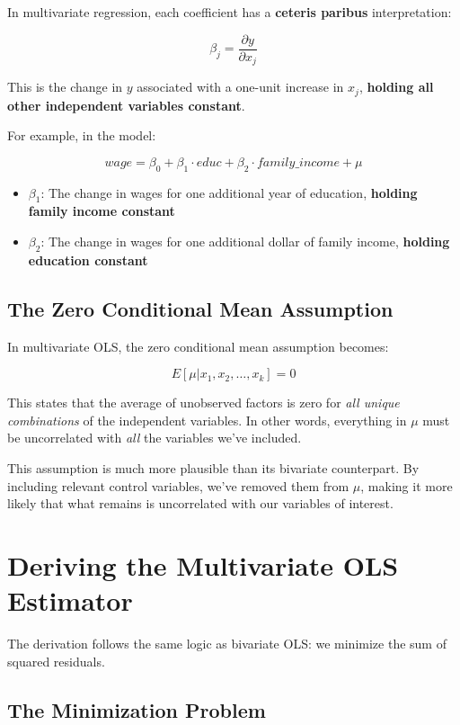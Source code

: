 \documentclass[
  letterpaper,
  DIV=11,
  numbers=noendperiod]{scrreprt}
\providecommand{\tightlist}{%
  \setlength{\itemsep}{0pt}\setlength{\parskip}{0pt}}
\begin{document}
In multivariate regression, each coefficient has a \textbf{ceteris
paribus} interpretation:

\[
\beta_j = \frac{\partial y}{\partial x_j}
\]

This is the change in \(y\) associated with a one-unit increase in
\(x_j\), \textbf{holding all other independent variables constant}.

For example, in the model:

\[
wage = \beta_0 + \beta_1 \cdot educ + \beta_2 \cdot family\_income + \mu
\]

\begin{itemize}
\tightlist
\item
  \(\beta_1\): The change in wages for one additional year of education,
  \textbf{holding family income constant}
\item
  \(\beta_2\): The change in wages for one additional dollar of family
  income, \textbf{holding education constant}
\end{itemize}

\subsection{The Zero Conditional Mean
Assumption}\label{the-zero-conditional-mean-assumption}

In multivariate OLS, the zero conditional mean assumption becomes:

\[
E[\mu | x_1, x_2, \ldots, x_k] = 0
\]

This states that the average of unobserved factors is zero for \emph{all
unique combinations} of the independent variables. In other words,
everything in \(\mu\) must be uncorrelated with \emph{all} the variables
we've included.

This assumption is much more plausible than its bivariate counterpart.
By including relevant control variables, we've removed them from
\(\mu\), making it more likely that what remains is uncorrelated with
our variables of interest.

\section{Deriving the Multivariate OLS
Estimator}\label{deriving-the-multivariate-ols-estimator}

The derivation follows the same logic as bivariate OLS: we minimize the
sum of squared residuals.

\subsection{The Minimization Problem}\label{the-minimization-problem-1}
\end{document}
